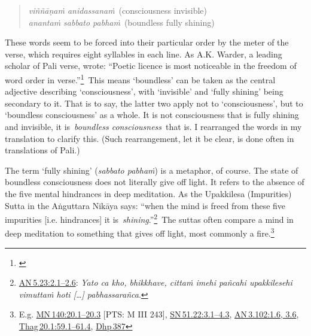 \documentclass[10pt, openany]{book}
\begin{document}
\begin{quote}


\begin{itemize}

\textit{viññāṇaṁ anidassanaṁ} (consciousness invisible) \\ \textit{anantaṁ sabbato pabhaṁ} (boundless fully shining)

\end{itemize}

\end{quote}
These words seem to be forced into their particular order by the meter of the verse, which requires eight syllables in each line. As A.K. Warder, a leading scholar of Pali verse, wrote: “Poetic licence is most noticeable in the freedom of word order in verse.”\footnote {\cite{Warder}} This means ‘boundless’ can be taken as the central adjective describing ‘consciousness’, with ‘invisible’ and ‘fully shining’ being secondary to it. That is to say, the latter two apply not to ‘consciousness’, but to ‘boundless consciousness’ as a whole. It is not consciousness that is fully shining and invisible, it is \textit{boundless consciousness} that is. I rearranged the words in my translation to clarify this. (Such rearrangement, let it be clear, is done often in translations of Pali.)


The term ‘fully shining’ (\textit{sabbato pabhaṁ}) is a metaphor, of course. The state of boundless consciousness does not literally give off light. It refers to the absence of the five mental hindrances in deep meditation. As the Upakkilesa (Impurities) Sutta in the Aṅguttara Nikāya says: “when the mind is freed from these five impurities [i.e. hindrances] it is \textit{shining}.”\footnote {\href{https://suttacentral.net/an5.23/en/sujato\#2.1}{AN 5.23:2.1–2.6}: \textit{Yato ca kho, bhikkhave, cittaṁ imehi pañcahi upakkilesehi vimuttaṁ hoti […] pabhassarañca}.} The suttas often compare a mind in deep meditation to something that gives off light, most commonly a fire.\footnote {E.g. \href{https://suttacentral.net/mn140/en/sujato\#20.1}{MN 140:20.1–20.3} [PTS: M III 243], \href{https://suttacentral.net/sn51.22/en/sujato\#3.1}{SN 51.22:3.1–4.3}, \href{https://suttacentral.net/an3.102/en/sujato\#1.6}{AN 3.102:1.6, 3.6}, \href{https://suttacentral.net/thag20.1/en/sujato\#59.1}{Thag 20.1:59.1–61.4}, \href{https://suttacentral.net/dhp387/en/sujato}{Dhp 387}}
\end{document}
